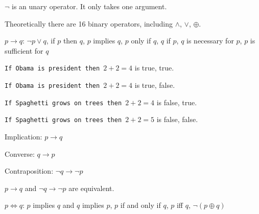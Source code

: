 $\lnot$ is an unary operator. It only takes one argument.

Theoretically there are 16 binary operators, including $\land$, $\lor$, $\oplus$.

\begin{defn}

$p \rightarrow q$: $\lnot p \lor q$, if $p$ then $q$, $p$ implies $q$, $p$ only if $q$, $q$ if $p$, $q$ is necessary for $p$, $p$ is sufficient for $q$   

\end{defn}

\begin{ex}

\texttt{If Obama is president then }$2 + 2 = 4$ is true, true.

\texttt{If Obama is president then }$2 + 2 = 4$ is true, false.

\texttt{If Spaghetti grows on trees then }$2 + 2 = 4$ is false, true.

\texttt{If Spaghetti grows on trees then }$2 + 2 = 5$ is false, false.

\end{ex}

\begin{defn}

Implication: $p \rightarrow q$

\end{defn}

\begin{defn}

Converse: $q \rightarrow p$

\end{defn}

\begin{defn}

Contraposition: $\lnot q \rightarrow \lnot p$

\end{defn}

\begin{theorem}

$p \rightarrow q$ and $\lnot q \rightarrow \lnot p$ are equivalent.

\end{theorem}

\begin{defn}

$p \Leftrightarrow q$: $p$ implies $q$ and $q$ implies $p$, $p$ if and only if $q$, $p$ iff $q$, $\lnot(p \oplus q)$

\end{defn}

